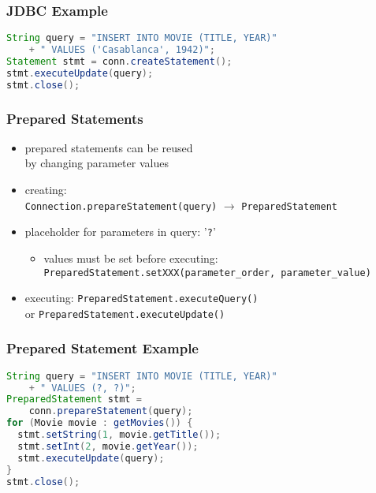 \documentclass[dvipsnames]{beamer}
\theoremstyle{plain}
\begin{document}
\begin{frame}[fragile]
  \frametitle{JDBC Example}

  \begin{example}[inserting]
    \begin{lstlisting}[language=Java]
String query = "INSERT INTO MOVIE (TITLE, YEAR)"
    + " VALUES ('Casablanca', 1942)";
Statement stmt = conn.createStatement();
stmt.executeUpdate(query);
stmt.close();
    \end{lstlisting}
  \end{example}
\end{frame}

\begin{frame}
  \frametitle{Prepared Statements}

  \begin{itemize}
    \item prepared statements can be reused\\
      by changing parameter values

    \pause
    \medskip
    \item creating:\\
      \lstinline!Connection.prepareStatement(query)!
      $\rightarrow$ \lstinline!PreparedStatement!
    \item placeholder for parameters in query: '\lstinline!?!'
    \begin{itemize}
      \item values must be set before executing:\\
	\lstinline!PreparedStatement.setXXX(parameter_order, parameter_value)!
    \end{itemize}

    \pause
    \medskip
    \item executing: \lstinline!PreparedStatement.executeQuery()!\\
      or \lstinline!PreparedStatement.executeUpdate()!
  \end{itemize}
\end{frame}

\begin{frame}[fragile]
  \frametitle{Prepared Statement Example}

  \begin{example}
    \begin{lstlisting}[language=Java]
String query = "INSERT INTO MOVIE (TITLE, YEAR)"
    + " VALUES (?, ?)";
PreparedStatement stmt =
    conn.prepareStatement(query);
for (Movie movie : getMovies()) {
  stmt.setString(1, movie.getTitle());
  stmt.setInt(2, movie.getYear());
  stmt.executeUpdate(query);
}
stmt.close();
    \end{lstlisting}
  \end{example}
\end{frame}
\end{document}
